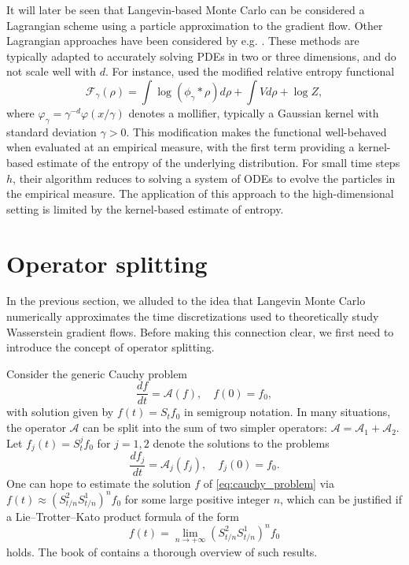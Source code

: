 \documentclass[final,12pt]{colt2018}
\begin{document}
It will later be seen that Langevin-based Monte Carlo can be considered a Lagrangian scheme using a particle approximation to the gradient flow. Other Lagrangian approaches have been considered by e.g. \citet{carrillo2015numerical,benamou2016discretization,carrillo2017blob}. These methods are typically adapted to accurately solving PDEs in two or three dimensions, and do not scale well with $d$. For instance, \citet{carrillo2017blob} used the modified relative entropy functional
\begin{equation}
\mathcal{F}_\gamma(\rho) =  \int \log (\phi_\gamma * \rho) d\rho + \int V d\rho + \log Z,
\end{equation}
where $\varphi_\gamma = \gamma^{-d} \varphi(x/\gamma)$ denotes a mollifier, typically a Gaussian kernel with standard deviation $\gamma>0$.
This modification makes the functional well-behaved when evaluated at an empirical measure, with the first term providing a kernel-based estimate of the entropy of the underlying distribution. For small time steps $h$, their algorithm reduces to solving a system of ODEs to evolve the particles in the empirical measure. The application of this approach to the high-dimensional setting is limited by the kernel-based estimate of entropy.



\section{Operator splitting}\label{sec:operator_splitting}
In the previous section, we alluded to the idea that Langevin Monte Carlo numerically approximates the time discretizations used to theoretically study Wasserstein gradient flows. Before making this connection clear, we first need to introduce the concept of operator splitting. 

Consider the generic Cauchy problem
\begin{equation}\label{eq:cauchy_problem}
\frac{df}{dt} = \mathcal{A}(f), \quad f(0) = f_0,
\end{equation}
with solution given by $f(t) = S_t f_0$ in semigroup notation. In many situations, the operator $\mathcal{A}$ can be split into the sum of two simpler operators: $\mathcal{A} = \mathcal{A}_1 + \mathcal{A}_2$. Let $f_j(t) = S^j_t f_0$ for $j = 1, 2$ denote the solutions to the problems
\begin{equation}\label{eq:cauchy_problem_split}
\frac{df_j}{dt} = \mathcal{A}_j(f_j), \quad f_j(0) = f_0.
\end{equation}
One can hope to estimate the solution $f$ of \eqref{eq:cauchy_problem} via $f(t) \approx (S^2_{t/n} S^1_{t/n})^n f_0$ for some large positive integer $n$, which can be justified if a Lie--Trotter--Kato product formula of the form 
\begin{equation}\label{eq:trotter}
f(t) = \lim_{n \to +\infty} (S^2_{t/n} S^1_{t/n})^n f_0
\end{equation}
holds. The book of \citet{holden2010splitting} contains a thorough overview of such results.
\end{document}

